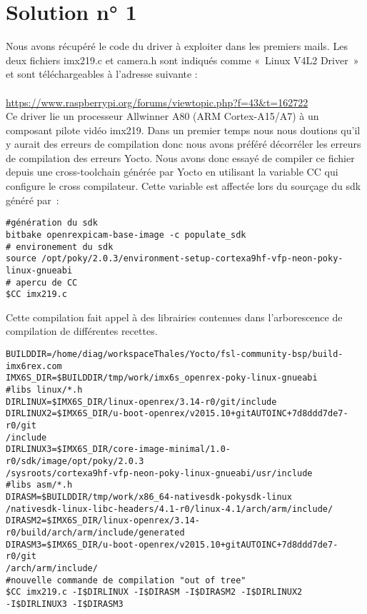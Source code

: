 
\chapter{Solution n° 1} %

\label{Chapter2} %


Nous avons récupéré le code du driver à exploiter dans les premiers mails. Les deux
fichiers imx219.c et camera.h sont indiqués comme « Linux V4L2 Driver » et sont
téléchargeables à l'adresse suivante : \\ \\
\href{https://www.raspberrypi.org/forums/viewtopic.php?f=43&t=162722}{https://www.raspberrypi.org/forums/viewtopic.php?f=43\&t=162722} \\

Ce driver lie un processeur Allwinner A80 (ARM Cortex-A15/A7) à un composant pilote vidéo
imx219. Dans un premier temps nous nous doutions qu’il y aurait des erreurs de compilation
donc nous avons préféré décorréler les erreurs de compilation des erreurs  Yocto. Nous
avons donc essayé de compiler ce fichier depuis une cross-toolchain générée par Yocto en
utilisant la variable CC qui configure le cross compilateur. Cette variable est affectée
lors du sourçage du sdk généré par :

\begin{lstlisting}
#génération du sdk
bitbake openrexpicam-base-image -c populate_sdk
# environement du sdk
source /opt/poky/2.0.3/environment-setup-cortexa9hf-vfp-neon-poky-linux-gnueabi
# apercu de CC
$CC imx219.c
\end{lstlisting}

Cette compilation fait appel à des librairies contenues dans l’arborescence de
compilation de différentes recettes.

\begin{lstlisting}
BUILDDIR=/home/diag/workspaceThales/Yocto/fsl-community-bsp/build-imx6rex.com
IMX6S_DIR=$BUILDDIR/tmp/work/imx6s_openrex-poky-linux-gnueabi
#libs linux/*.h
DIRLINUX=$IMX6S_DIR/linux-openrex/3.14-r0/git/include
DIRLINUX2=$IMX6S_DIR/u-boot-openrex/v2015.10+gitAUTOINC+7d8ddd7de7-r0/git
/include
DIRLINUX3=$IMX6S_DIR/core-image-minimal/1.0-r0/sdk/image/opt/poky/2.0.3
/sysroots/cortexa9hf-vfp-neon-poky-linux-gnueabi/usr/include
#libs asm/*.h
DIRASM=$BUILDDIR/tmp/work/x86_64-nativesdk-pokysdk-linux
/nativesdk-linux-libc-headers/4.1-r0/linux-4.1/arch/arm/include/
DIRASM2=$IMX6S_DIR/linux-openrex/3.14-r0/build/arch/arm/include/generated
DIRASM3=$IMX6S_DIR/u-boot-openrex/v2015.10+gitAUTOINC+7d8ddd7de7-r0/git
/arch/arm/include/
#nouvelle commande de compilation "out of tree"
$CC imx219.c -I$DIRLINUX -I$DIRASM -I$DIRASM2 -I$DIRLINUX2
-I$DIRLINUX3 -I$DIRASM3
\end{lstlisting}

